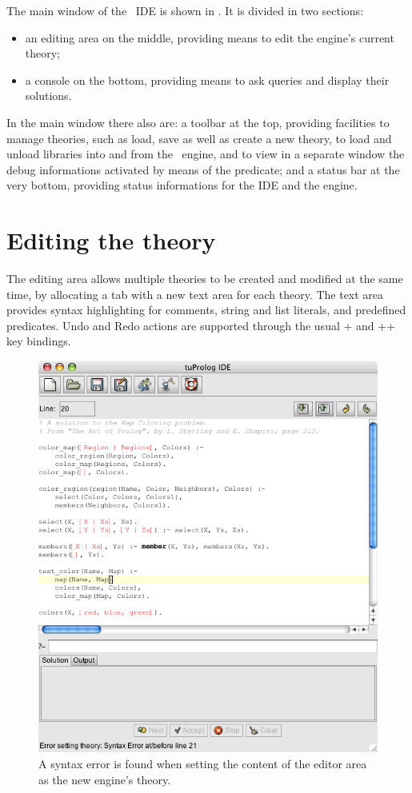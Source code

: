The main window of the \tuprolog\ IDE is shown in .
%
It is divided in two sections:
%
\begin{itemize}
\item an editing area on the middle, providing means to edit the engine's current theory;
\item a console on the bottom, providing means to ask queries and display their solutions.
\end{itemize}
%
In the main window there also are:
%
a toolbar at the top, providing facilities to manage theories, such as load, save as well as create a new theory, to load and unload libraries into and from the \tuprolog\ engine, and to view in a separate window the debug informations activated by means of the  predicate;
%
and a status bar at the very bottom, providing status informations for the IDE and the engine.

\section{Editing the theory}

The editing area allows multiple theories to be created and modified at the same time, by allocating a tab with a new text area for each theory.
%
The text area provides syntax highlighting for comments, string and list literals, and predefined predicates.
%
Undo and Redo actions are supported through the usual + and ++ key bindings.

\begin{figure}
\centering
\includegraphics[scale=0.60]{images/syntaxErrorFound}
\caption{A syntax error is found when setting the content of the editor area as the new engine's theory.}
\label{syntax-error-found}
\end{figure}

